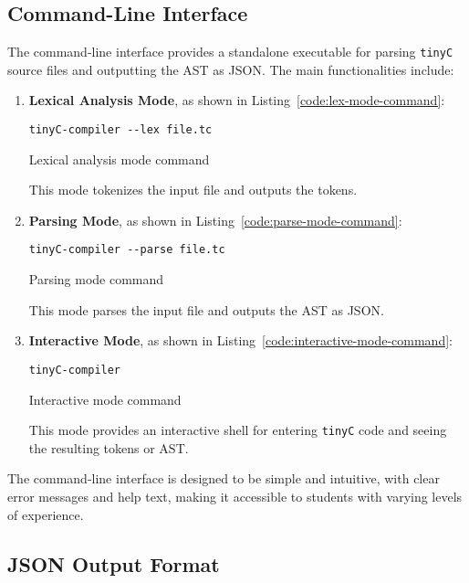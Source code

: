 \subsection{Command-Line Interface}

The command-line interface provides a standalone executable for parsing \texttt{tinyC} source files and outputting the AST as JSON. The main functionalities include:

\begin{enumerate}
    \item \textbf{Lexical Analysis Mode}, as shown in Listing~\ref{code:lex-mode-command}:
\begin{listing}[h]
\begin{verbatim}
tinyC-compiler --lex file.tc
\end{verbatim}
\caption{Lexical analysis mode command}
\label{code:lex-mode-command}
\end{listing}
    This mode tokenizes the input file and outputs the tokens.

    \item \textbf{Parsing Mode}, as shown in Listing~\ref{code:parse-mode-command}:
\begin{listing}[h]
\begin{verbatim}
tinyC-compiler --parse file.tc
\end{verbatim}
\caption{Parsing mode command}
\label{code:parse-mode-command}
\end{listing}
    This mode parses the input file and outputs the AST as JSON.

    \item \textbf{Interactive Mode}, as shown in Listing~\ref{code:interactive-mode-command}:
\begin{listing}[h]
\begin{verbatim}
tinyC-compiler
\end{verbatim}
\caption{Interactive mode command}
\label{code:interactive-mode-command}
\end{listing}
    This mode provides an interactive shell for entering \texttt{tinyC} code and seeing the resulting tokens or AST.
\end{enumerate}

The command-line interface is designed to be simple and intuitive, with clear error messages and help text, making it accessible to students with varying levels of experience.

\subsection{JSON Output Format}

